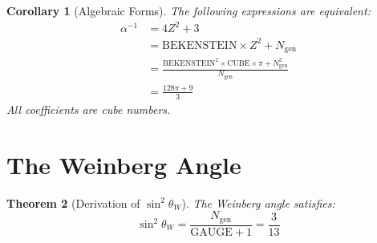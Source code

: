 \documentclass[twocolumn,showpacs,preprintnumbers,amsmath,amssymb,prd]{revtex4-2}
\newtheorem{theorem}{Theorem}[section]
\newtheorem{corollary}[theorem]{Corollary}
\begin{document}
\begin{corollary}[Algebraic Forms]
The following expressions are equivalent:
\begin{align}
\alpha^{-1} &= 4Z^2 + 3 \\
&= \text{BEKENSTEIN} \times Z^2 + N_{\text{gen}} \\
&= \frac{\text{BEKENSTEIN}^2 \times \text{CUBE} \times \pi + N_{\text{gen}}^2}{N_{\text{gen}}} \\
&= \frac{128\pi + 9}{3}
\end{align}
All coefficients are cube numbers.
\end{corollary}

\section{The Weinberg Angle}

\begin{theorem}[Derivation of $\sin^2\theta_W$]
\label{thm:weinberg}
The Weinberg angle satisfies:
\begin{equation}
\boxed{\sin^2\theta_W = \frac{N_{\text{gen}}}{\text{GAUGE} + 1} = \frac{3}{13}}
\end{equation}
\end{theorem}
\end{document}
